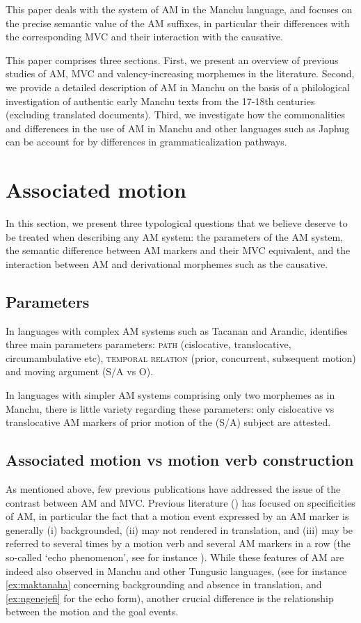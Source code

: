 \documentclass{article}
\begin{document}
This paper deals with the system of AM in the Manchu language, and focuses on the precise semantic value of the AM suffixes, in particular their differences with the corresponding MVC and their interaction with the causative. 

This paper comprises three sections. First, we present an overview of previous studies of AM, MVC and valency-increasing morphemes in the literature. Second, we provide a detailed description of AM in Manchu on the basis of a philological investigation of authentic early Manchu texts from the 17-18th centuries (excluding translated documents). Third, we investigate how the commonalities and differences in the use of AM in Manchu and other languages such as Japhug can be account for by differences in grammaticalization pathways.

\section{Associated motion}
In this section, we present three typological questions that we believe deserve to be treated when describing any AM system: the parameters of the AM system, the semantic difference between AM markers and their MVC equivalent, and the interaction between AM and derivational morphemes such as the causative.

\subsection{Parameters}
In languages with complex AM systems such as Tacanan and Arandic, \citet[8]{guillaume16am} identifies three main parameters parameters: \textsc{path} (cislocative, translocative, circumambulative etc),  \textsc{temporal relation} (prior, concurrent, subsequent motion) and moving argument (S/A vs O). 

In languages with simpler AM systems comprising only two morphemes as in Manchu, there is little variety regarding these parameters: only cislocative vs translocative AM markers of prior motion of the (S/A) subject are attested.

\subsection{Associated motion vs motion verb construction} \label{sec:japhug.am.mvc}
As mentioned above, few previous publications have addressed the issue of the contrast between AM and MVC. Previous literature (\citealt{wilkins91associated.motion, guillaume16am}) has focused on specificities of AM, in particular the fact that a motion event expressed by an AM marker is generally (i) backgrounded, (ii) may not rendered in translation, and (iii) may be referred to several times by a motion verb and several AM markers in a row (the so-called `echo phenomenon', see for instance \citet[11]{guillaume16am}). While these features of AM are indeed also observed in Manchu and other Tungusic languages,  (see for instance \ref{ex:maktanaha} concerning backgrounding and absence in translation, and \ref{ex:ngenejefi} for the echo form), another crucial difference is the relationship between the motion and the goal events. 
\end{document}
